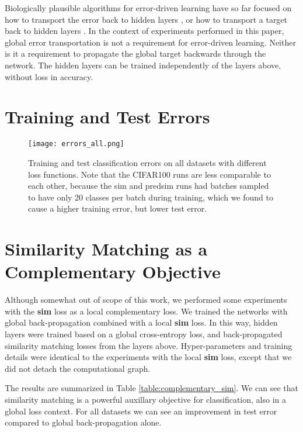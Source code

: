 \documentclass{article}
\begin{document}
Biologically plausible algorithms for error-driven learning have so far focused on how to transport the error back to hidden layers \cite{LillicrapCTA14,Nokland16}, or how to transport a target back to hidden layers \cite{XieS03,Bengio14,LeeZFB15,ScellierB17,WhittingtonB17}. In the context of experiments performed in this paper, global error transportation is not a requirement for error-driven learning. Neither is it a requirement to propagate the global target backwards through the network. The hidden layers can be trained independently of the layers above, without loss in accuracy.

\newpage



\newpage
\onecolumn
\appendix
\appendixpage
\section{Training and Test Errors}

\begin{figure*}[h]
  \texttt{[image: errors\_all.png]}
  \caption{Training and test classification errors on all datasets with different loss functions. Note that the CIFAR100 runs are less comparable to each other, because the sim and predsim runs had batches sampled to have only 20 classes per batch during training, which we found to cause a higher training error, but lower test error. }
  \label{fig:errors_all}
\end{figure*}

\newpage
\section{Similarity Matching as a Complementary Objective}
Although somewhat out of scope of this work, we performed some experiments with the \textbf{sim} loss as a local complementary loss. We trained the networks with global back-propagation combined with a local \textbf{sim} loss. In this way, hidden layers were trained based on a global cross-entropy loss, and back-propagated similarity matching losses from the layers above. Hyper-parameters and training details were identical to the experiments with the local \textbf{sim} loss, except that we did not detach the computational graph.

The results are summarized in Table \ref{table:complementary_sim}. We can see that similarity matching is a powerful auxillary objective for classification, also in a global loss context. For all datasets we can see an improvement in test error compared to global back-propagation alone.
\end{document}
